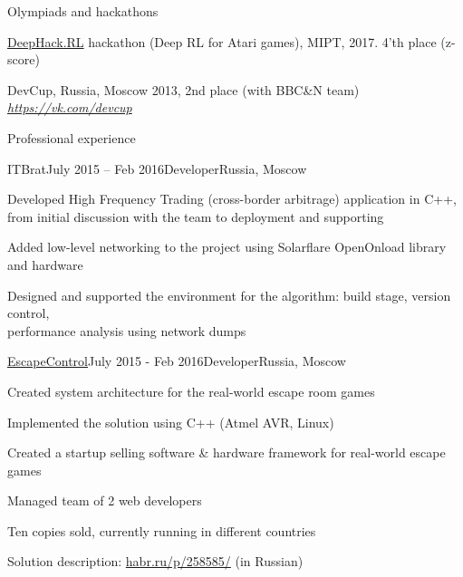 \documentclass{resume} %
\begin{document}
\begin{rSection}{Olympiads and hackathons}
\item \href{http://rl.deephack.me/}{DeepHack.RL} hackathon (Deep RL for Atari games), MIPT, 2017. 4'th place (z-score)
\item DevCup, Russia, Moscow 2013, 2nd place (with BBC\&N team)\\
\hfill {\em \url{https://vk.com/devcup}}
\end{rSection}


\begin{rSection}{Professional experience}
\begin{rSubsection}{ITBrat}{July 2015 -- Feb 2016}{Developer}{Russia, Moscow}
	\item Developed High Frequency Trading (cross-border arbitrage) application in C++, from initial discussion with the team to deployment and supporting
	\item Added low-level networking to the project using Solarflare OpenOnload library and hardware
	\item Designed and supported the environment for the algorithm: build stage, version control,\\ performance analysis using network dumps
\end{rSubsection}
	
\begin{rSubsection}{\href{http://escapecontrol.ru}{EscapeControl}}{July 2015 - Feb 2016}{Developer}{Russia, Moscow}
	\item Created system architecture for the real-world escape room games
	\item Implemented the solution using C++ (Atmel AVR, Linux)
	\item Created a startup selling software \& hardware framework for real-world escape games
	\item Managed team of 2 web developers
	\item Ten copies sold, currently running in different countries
	\item Solution description: \url{habr.ru/p/258585/} (in Russian)
\end{rSubsection}
		
\end{rSection}
\end{document}
